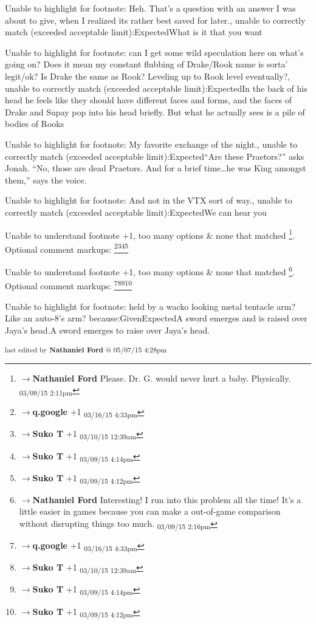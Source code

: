 	Unable to highlight for footnote: Heh.  That's a question with an answer I was about to give, when I realized its rather best saved for later., unable to correctly match (exceeded acceptable limit):ExpectedWhat is it that you want

	Unable to highlight for footnote: can I get some wild speculation here on what's going on?  Does it mean my constant flubbing of Drake/Rook name is sorta' legit/ok?  Is Drake the same as Rook? Leveling up to Rook level eventually?, unable to correctly match (exceeded acceptable limit):ExpectedIn the back of his head he feels like they should have different faces and forms, and the faces of Drake and Supay pop into his head briefly.  But what he actually sees is a pile of bodies of Rooks

	Unable to highlight for footnote: My favorite exchange of the night., unable to correctly match (exceeded acceptable limit):Expected“Are these Praetors?” asks Jonah.
“No, those are dead Praetors.  And for a brief time…he was King amongst them,” says the voice.

	Unable to highlight for footnote: And not in the VTX sort of way., unable to correctly match (exceeded acceptable limit):ExpectedWe can hear you

	Unable to understand footnote +1, too many options & none that matched \footnote{$\rightarrow$\textbf{Nathaniel Ford }Please. Dr. G. would never hurt a baby. Physically. \textsubscript{03/09/15 2:11pm}}. Optional comment markups: \footnote{$\rightarrow$\textbf{q.google }+1 \textsubscript{03/16/15 4:33pm}}\footnote{$\rightarrow$\textbf{Suko T }+1 \textsubscript{03/10/15 12:39am}}\footnote{$\rightarrow$\textbf{Suko T }+1 \textsubscript{03/09/15 4:14pm}}\footnote{$\rightarrow$\textbf{Suko T }+1 \textsubscript{03/09/15 4:12pm}} 

	Unable to understand footnote +1, too many options & none that matched \footnote{$\rightarrow$\textbf{Nathaniel Ford }Interesting! I run into this problem all the time! It's a little easier in games because you can make a out-of-game comparison without disrupting things too much. \textsubscript{03/09/15 2:16pm}}. Optional comment markups: \footnote{$\rightarrow$\textbf{q.google }+1 \textsubscript{03/16/15 4:33pm}}\footnote{$\rightarrow$\textbf{Suko T }+1 \textsubscript{03/10/15 12:39am}}\footnote{$\rightarrow$\textbf{Suko T }+1 \textsubscript{03/09/15 4:14pm}}\footnote{$\rightarrow$\textbf{Suko T }+1 \textsubscript{03/09/15 4:12pm}} 

	Unable to highlight for footnote: held by a wacko looking metal tentacle arm? Like an auto-8's arm? because:GivenExpectedA sword emerges and is raised over Jaya’s head.A sword emerges to raise over Jaya’s head.


\fi

\vspace{\fill}

\begin{flushright}
\textsubscript{last edited by \textbf{Nathaniel Ford} @ 05/07/15 4:28pm}
\end{flushright}

